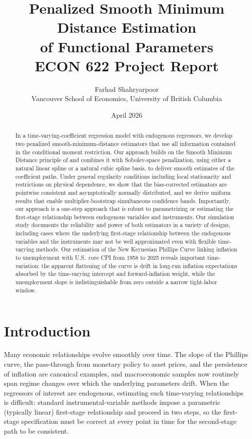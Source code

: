 \documentclass[12pt]{article}
\title{\textbf{Penalized Smooth Minimum Distance Estimation \\of Functional Parameters} \\[0.5em]
\large ECON 622 Project Report}
\author{Farhad Shahryarpoor \\
\small Vancouver School of Economics, University of British Columbia}
\date{April 2026}
\begin{document}
\maketitle

\begin{abstract}
\noindent
In a time-varying-coefficient regression model with endogenous regressors, we develop two penalized smooth-minimum-distance estimators that use all information contained in the conditional moment restriction. Our approach builds on the Smooth Minimum Distance principle of \citet{AntoineSun2024} and combines it with Sobolev-space penalization, using either a natural linear spline or a natural cubic spline basis, to deliver smooth estimates of the coefficient paths. Under general regularity conditions including local stationarity and restrictions on physical dependence, we show that the bias-corrected estimators are pointwise consistent and asymptotically normally distributed, and we derive uniform results that enable multiplier-bootstrap simultaneous confidence bands. Importantly, our approach is a one-step approach that is robust to parametrizing or estimating the first-stage relationship between endogenous variables and instruments. Our simulation study documents the reliability and power of both estimators in a variety of designs, including cases where the underlying first-stage relationship between the endogenous variables and the instruments may not be well approximated even with flexible time-varying methods. Our estimation of the New Keynesian Phillips Curve linking inflation to unemployment with U.S.\ core CPI from 1958 to 2025 reveals important time-variation: the apparent flattening of the curve is drift in long-run inflation expectations absorbed by the time-varying intercept and forward-inflation weight, while the unemployment slope is indistinguishable from zero outside a narrow tight-labor window.
\end{abstract}

\section{Introduction}

Many economic relationships evolve smoothly over time. The slope of the Phillips curve, the pass-through from monetary policy to asset prices, and the persistence of inflation are canonical examples, and macroeconomic samples now routinely span regime changes over which the underlying parameters drift. When the regressors of interest are endogenous, estimating such time-varying relationships is difficult: standard instrumental-variable methods impose a parametric (typically linear) first-stage relationship and proceed in two steps, so the first-stage specification must be correct at every point in time for the second-stage path to be consistent.
\end{document}
